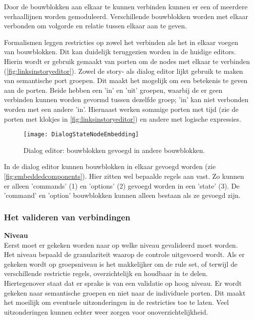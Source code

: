 Door de bouwblokken aan elkaar te kunnen verbinden kunnen er een of meerdere verhaallijnen worden gemoduleerd. Verschillende bouwblokken worden met elkaar verbonden om volgorde en relatie tussen elkaar aan te geven. 

Formalismen leggen restricties op zowel het verbinden als het in elkaar voegen van bouwblokken. Dit kan duidelijk teruggezien worden in de huidige editors. Hierin wordt er gebruik gemaakt van porten om de nodes met elkaar te verbinden (\autoref{fig:linksinstoryeditor}). Zowel de story- als dialog editor lijkt gebruik te maken van semantische port groepen. Dit maakt het mogelijk om een betekenis te geven aan de porten. Beide hebben een 'in' en 'uit' groepen, waarbij de er geen verbinden kunnen worden gevormd tussen dezelfde groep; 'in' kan niet verbonden worden met een andere 'in'. Hiernaast werken sommige porten met tijd (zie de porten met klokjes in \autoref{fig:linksinstoryeditor}) en andere met logische expressies.

\begin{wrapfigure}{r}{0.32\textwidth}
    \centering    
    \texttt{[image: DialogStateNodeEmbedding]}
    \caption{Dialog editor: bouwblokken gevoegd in andere bouwblokken.}
    \label{fig:embeddedcomponents}
\end{wrapfigure}

In de dialog editor kunnen bouwblokken in elkaar gevoegd worden (zie \autoref{fig:embeddedcomponents}). Hier zitten wel bepaalde regels aan vast. Zo kunnen er alleen 'commands' (1) en 'options' (2) gevoegd worden in een 'state' (3). De 'command' en 'option' bouwblokken kunnen alleen bestaan als ze gevoegd zijn.

\clearpage
\subsubsection{Het valideren van verbindingen}
\noindent\textbf{Niveau}\\
Eerst moet er gekeken worden naar op welke niveau gevalideerd moet worden. Het niveau bepaald de granulariteit waarop de controle uitgevoerd wordt. Als er gekeken wordt op groepsniveau is het makkelijker om de rule set, of terwijl de verschillende restrictie regels, overzichtelijk en houdbaar in te delen. Hiertegenover staat dat er sprake is van een validatie op hoog niveau. Er wordt gekeken naar semantische groepen en niet naar de individuele porten. Dit maakt het moeilijk om eventuele uitzonderingen in de restricties toe te laten. Veel uitzonderingen kunnen echter weer zorgen voor onoverzichtelijkheid.

